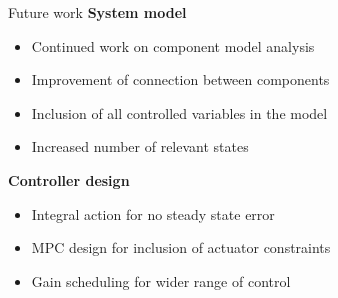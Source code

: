 \begin{frame}{Future work}
	 \textbf{System model}
	 \begin{itemize}
	 	\item Continued work on component model analysis
	 	\item Improvement of connection between components
	 	\item Inclusion of all controlled variables in the model
	 	\item Increased number of relevant states
	 \end{itemize}
 
 \bigskip
 
 	\textbf{Controller design}
	\begin{itemize}
 		\item Integral action for no steady state error
 		\item MPC design for inclusion of actuator constraints
 		\item Gain scheduling for wider range of control
 	\end{itemize}
\end{frame}